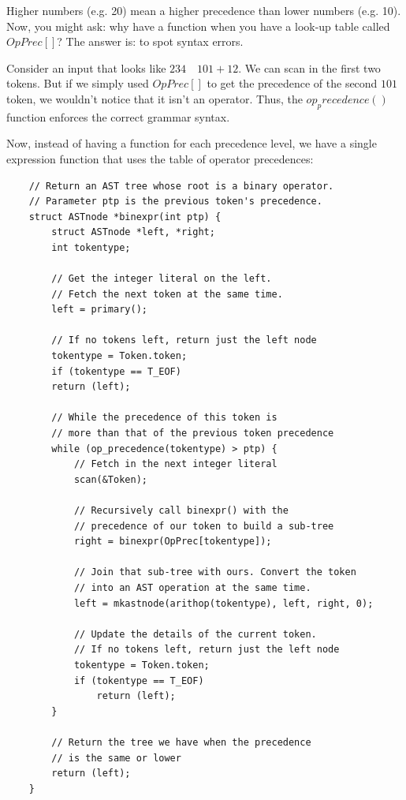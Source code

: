 \documentclass[journal, onecolumn, 12pt]{IEEEtran}
\begin{document}
Higher numbers (e.g. 20) mean a higher precedence than lower numbers (e.g. 10). Now, you might ask: why have a function when you have a look-up table called $OpPrec[]$? The answer is: to spot syntax errors.

Consider an input that looks like $234\quad 101 + 12$. We can scan in the first two tokens. But if we simply used $OpPrec[]$ to get the precedence of the second $101$ token, we wouldn't notice that it isn't an operator. Thus, the $op_precedence()$ function enforces the correct grammar syntax.

Now, instead of having a function for each precedence level, we have a single expression function that uses the table of operator precedences:

\begin{lstlisting}
    // Return an AST tree whose root is a binary operator.
    // Parameter ptp is the previous token's precedence.
    struct ASTnode *binexpr(int ptp) {
        struct ASTnode *left, *right;
        int tokentype;
    
        // Get the integer literal on the left.
        // Fetch the next token at the same time.
        left = primary();
    
        // If no tokens left, return just the left node
        tokentype = Token.token;
        if (tokentype == T_EOF)
        return (left);
    
        // While the precedence of this token is
        // more than that of the previous token precedence
        while (op_precedence(tokentype) > ptp) {
            // Fetch in the next integer literal
            scan(&Token);
        
            // Recursively call binexpr() with the
            // precedence of our token to build a sub-tree
            right = binexpr(OpPrec[tokentype]);
        
            // Join that sub-tree with ours. Convert the token
            // into an AST operation at the same time.
            left = mkastnode(arithop(tokentype), left, right, 0);
        
            // Update the details of the current token.
            // If no tokens left, return just the left node
            tokentype = Token.token;
            if (tokentype == T_EOF)
                return (left);
        }
    
        // Return the tree we have when the precedence
        // is the same or lower
        return (left);
    }
\end{lstlisting}
\end{document}
